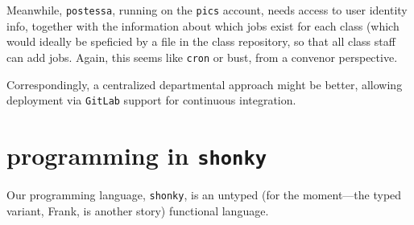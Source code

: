 \documentclass{article}
\begin{document}
Meanwhile, {\tt postessa}, running on the {\tt pics} account, needs access to user identity info, together with the information about which jobs exist for each class (which would ideally be speficied by a file in the class repository, so that all class staff can add jobs. Again, this seems like {\tt cron} or bust, from a convenor perspective.

Correspondingly, a centralized departmental approach might be better, allowing deployment via {\tt GitLab} support for continuous integration.


\section{programming in {\tt shonky}}

Our programming language, {\tt shonky}, is an untyped (for the moment---the typed variant, Frank, is another story)
functional language.
\end{document}
